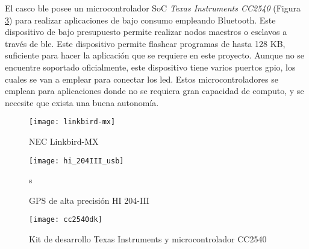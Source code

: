El casco \gls{ble} posee un microcontrolador \gls{SoC} \emph{Texas Instruments
CC2540} (Figura \ref{fig:cc2540}) para realizar aplicaciones de bajo consumo
empleando Bluetooth. Este dispositivo de bajo presupuesto permite realizar
nodos maestros o esclavos a través de \gls{ble}. Este dispositivo permite
flashear programas de hasta 128 KB, suficiente para hacer la aplicación que se
requiere en este proyecto. Aunque no se encuentre soportado oficialmente, este
dispositivo tiene varios puertos \gls{gpio}, los cuales se van a emplear para
conectar los led. Estos microcontroladores se emplean para aplicaciones donde
no se requiera gran capacidad de computo, y se necesite que exista una buena
autonomía.

\begin{figure}[h]
	\begin{center}
		\texttt{[image: linkbird-mx]}
		\caption{NEC Linkbird-MX}
		\label{fig:linkbird-mx}
	\end{center}
\end{figure}

\begin{figure}[h]
	\begin{center}
		\texttt{[image: hi\_204III\_usb]}
		\caption{GPS de alta precisión HI 204-III}
		\label{fig:hi204III}
	\end{center}s
\end{figure}

\begin{figure}[h]
	\begin{center}
		\texttt{[image: cc2540dk]}
		\caption{Kit de desarrollo Texas Instruments y microcontrolador CC2540}
		\label{fig:cc2540}
	\end{center}
\end{figure}
